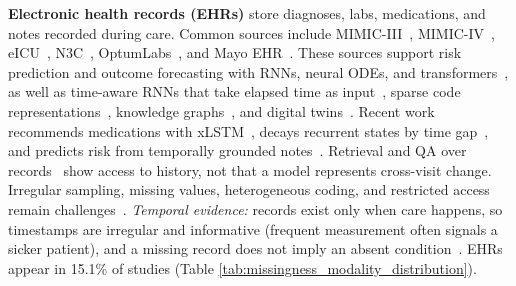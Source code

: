 \documentclass[11pt]{article}
\theoremstyle{plain}
\theoremstyle{definition}
\theoremstyle{remark}
\begin{document}
\noindent\textbf{Electronic health records (EHRs)} store diagnoses, labs, medications, and notes recorded during care. Common sources include MIMIC-III~\cite{johnson2016mimic}, MIMIC-IV~\cite{johnson2023mimic}, eICU~\cite{9926878}, N3C~\cite{9623284}, OptumLabs~\cite{8904622}, and Mayo EHR~\cite{9874547}. These sources support risk prediction and outcome forecasting with RNNs, neural ODEs, and transformers~\cite{10415843,10943948,9874605}, as well as time-aware RNNs that take elapsed time as input~\cite{9006400}, sparse code representations~\cite{9313227}, knowledge graphs~\cite{9679113}, and digital twins~\cite{9669428}. Recent work recommends medications with xLSTM~\citep{11670332}, decays recurrent states by time gap~\citep{11392806}, and predicts risk from temporally grounded notes~\citep{chaturvedi-etal-2026-early}. Retrieval and QA over records~\citep{agarwal-etal-2026-deterministic} show access to history, not that a model represents cross-visit change. Irregular sampling, missing values, heterogeneous coding, and restricted access remain challenges~\cite{8904478,9006400,10337299}. \emph{Temporal evidence:} records exist only when care happens, so timestamps are irregular and informative (frequent measurement often signals a sicker patient), and a missing record does not imply an absent condition~\cite{perveen2020handling,bazo2020handling}. EHRs appear in 15.1\% of studies (Table \ref{tab:missingness_modality_distribution}).
\end{document}
